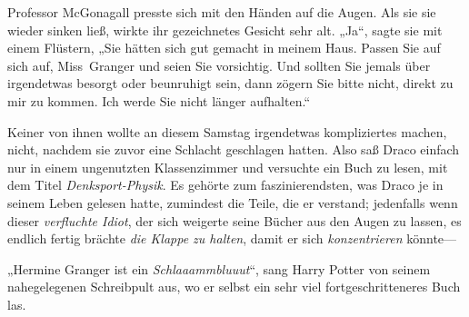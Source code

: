 Professor McGonagall presste sich mit den Händen auf die Augen. Als sie sie wieder sinken ließ, wirkte ihr gezeichnetes Gesicht sehr alt.
„Ja“, sagte sie mit einem Flüstern,
„Sie hätten sich gut gemacht in meinem Haus. Passen Sie auf sich auf, Miss~Granger und seien Sie vorsichtig. Und sollten Sie jemals über irgendetwas besorgt oder beunruhigt sein, dann zögern Sie bitte nicht, direkt zu mir zu kommen. Ich werde Sie nicht länger aufhalten.“


Keiner von ihnen wollte an diesem Samstag irgendetwas kompliziertes machen, nicht, nachdem sie zuvor eine Schlacht geschlagen hatten. Also saß Draco einfach nur in einem ungenutzten Klassenzimmer und versuchte ein Buch zu lesen, mit dem Titel \emph{Denksport-Physik}.%
Es gehörte zum faszinierendsten, was Draco je in seinem Leben gelesen hatte, zumindest die Teile, die er verstand; jedenfalls wenn dieser \emph{verfluchte Idiot}, der sich weigerte seine Bücher aus den Augen zu lassen, es endlich fertig brächte \emph{die Klappe zu halten}, damit er sich \emph{konzentrieren} könnte—

„Hermine Granger ist ein \emph{Schlaaammbluuut}“, sang Harry Potter von seinem nahegelegenen Schreibpult aus, wo er selbst ein sehr viel fortgeschritteneres Buch las.

